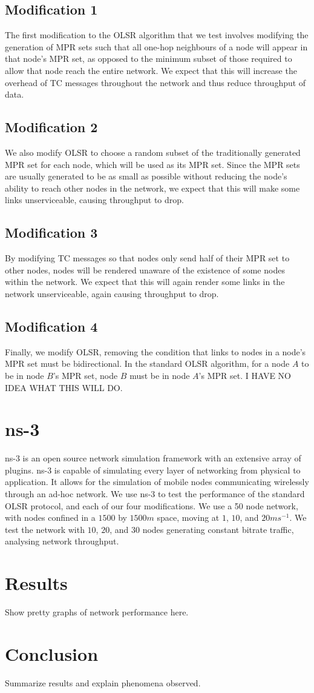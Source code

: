 \documentclass[12pt,a4paper]{article}
\begin{document}
\subsection{Modification 1}
The first modification to the OLSR algorithm that we test involves modifying the generation of MPR sets such that all one-hop neighbours of a node will appear in that node's MPR set, as opposed to the minimum subset of those required to allow that node reach the entire network. We expect that this will increase the overhead of TC messages throughout the network and thus reduce throughput of data.

\subsection{Modification 2}
We also modify OLSR to choose a random subset of the traditionally generated MPR set for each node, which will be used as its MPR set. Since the MPR sets are usually generated to be as small as possible without reducing the node's ability to reach other nodes in the network, we expect that this will make some links unserviceable, causing throughput to drop.

\subsection{Modification 3}
By modifying TC messages so that nodes only send half of their MPR set to other nodes, nodes will be rendered unaware of the existence of some nodes within the network. We expect that this will again render some links in the network unserviceable, again causing throughput to drop.

\subsection{Modification 4}
Finally, we modify OLSR, removing the condition that links to nodes in a node's MPR set must be bidirectional. In the standard OLSR algorithm, for a node \(A\) to be in node \(B\)'s MPR set, node \(B\) must be in node \(A\)'s MPR set. I HAVE NO IDEA WHAT THIS WILL DO.

\section{ns-3}
ns-3 is an open source network simulation framework with an extensive array of plugins. ns-3 is capable of simulating every layer of networking from physical to application. It allows for the simulation of mobile nodes communicating wirelessly through an ad-hoc network. We use ns-3 to test the performance of the standard OLSR protocol, and each of our four modifications. We use a 50 node network, with nodes confined in a \(1500\) by \(1500m\) space, moving at \(1\), \(10\), and \(20ms^{-1}\). We test the network with \(10\), \(20\), and \(30\) nodes generating constant bitrate traffic, analysing network throughput.

\section{Results}
Show pretty graphs of network performance here.

\section{Conclusion}
Summarize results and explain phenomena observed.



\end{document}
